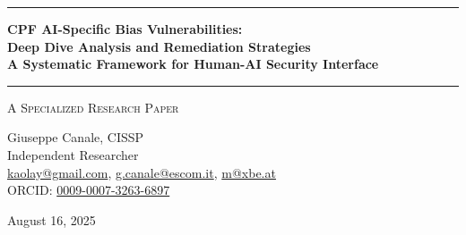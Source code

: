 \documentclass[11pt,a4paper]{article}
\begin{document}
\thispagestyle{empty}
\begin{center}

\vspace*{0.5cm}

\rule{\textwidth}{1.5pt}

\vspace{0.5cm}

{\LARGE \textbf{CPF AI-Specific Bias Vulnerabilities:}}\\[0.3cm]
{\LARGE \textbf{Deep Dive Analysis and Remediation Strategies}}\\[0.3cm]
{\LARGE \textbf{A Systematic Framework for Human-AI Security Interface}}

\vspace{0.5cm}

\rule{\textwidth}{1.5pt}

\vspace{0.3cm}

{\large \textsc{A Specialized Research Paper}}

\vspace{0.5cm}

{\Large Giuseppe Canale, CISSP}\\[0.2cm]
Independent Researcher\\[0.1cm]
\href{mailto:kaolay@gmail.com}{kaolay@gmail.com}, 
\href{mailto:g.canale@escom.it}{g.canale@escom.it}, 
\href{mailto:m8xbe.at}{m@xbe.at}\\[0.1cm]
ORCID: \href{https://orcid.org/0009-0007-3263-6897}{0009-0007-3263-6897}

\vspace{0.8cm}

{\large August 16, 2025}

\vspace{1cm}

\end{center}
\end{document}
